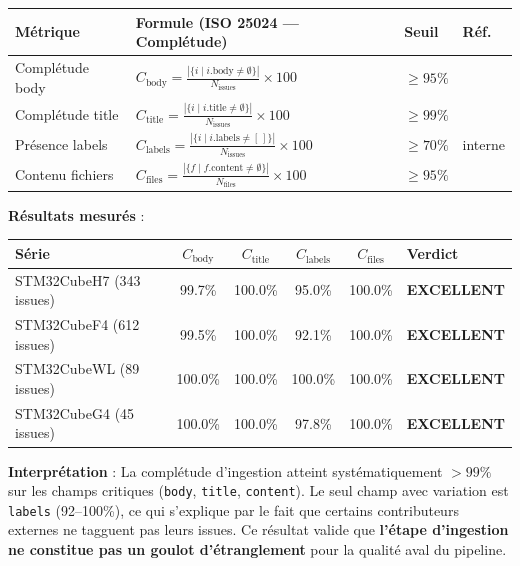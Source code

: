 \documentclass[12pt,a4paper]{report}
\begin{document}
\begin{longtable}{p{4.5cm}p{5.5cm}p{2.5cm}p{1.5cm}}
\toprule
\textbf{Métrique} & \textbf{Formule (ISO 25024 --- Complétude)} & \textbf{Seuil} & \textbf{Réf.} \\
\midrule
Complétude body & $C_{\text{body}} = \frac{|\{i \mid i.\text{body} \neq \emptyset\}|}{N_{\text{issues}}} \times 100$ & $\geq 95\%$ & \cite{iso25024} \\
Complétude title & $C_{\text{title}} = \frac{|\{i \mid i.\text{title} \neq \emptyset\}|}{N_{\text{issues}}} \times 100$ & $\geq 99\%$ & \cite{iso25024} \\
Présence labels & $C_{\text{labels}} = \frac{|\{i \mid i.\text{labels} \neq [\,]\}|}{N_{\text{issues}}} \times 100$ & $\geq 70\%$ & interne \\
Contenu fichiers & $C_{\text{files}} = \frac{|\{f \mid f.\text{content} \neq \emptyset\}|}{N_{\text{files}}} \times 100$ & $\geq 95\%$ & \cite{iso25024} \\
\bottomrule
\end{longtable}

\textbf{Résultats mesurés} :

\begin{longtable}{lccccl}
\toprule
\textbf{Série} & $C_{\text{body}}$ & $C_{\text{title}}$ & $C_{\text{labels}}$ & $C_{\text{files}}$ & \textbf{Verdict} \\
\midrule
STM32CubeH7 (343 issues) & 99.7\% & 100.0\% & 95.0\% & 100.0\% & \textcolor{green!60!black}{\textbf{EXCELLENT}} \\
STM32CubeF4 (612 issues) & 99.5\% & 100.0\% & 92.1\% & 100.0\% & \textcolor{green!60!black}{\textbf{EXCELLENT}} \\
STM32CubeWL (89 issues) & 100.0\% & 100.0\% & 100.0\% & 100.0\% & \textcolor{green!60!black}{\textbf{EXCELLENT}} \\
STM32CubeG4 (45 issues) & 100.0\% & 100.0\% & 97.8\% & 100.0\% & \textcolor{green!60!black}{\textbf{EXCELLENT}} \\
\bottomrule
\end{longtable}

\textbf{Interprétation} : La complétude d'ingestion atteint systématiquement $>99\%$ sur les champs critiques (\texttt{body}, \texttt{title}, \texttt{content}). Le seul champ avec variation est \texttt{labels} (92--100\%), ce qui s'explique par le fait que certains contributeurs externes ne tagguent pas leurs issues. Ce résultat valide que \textbf{l'étape d'ingestion ne constitue pas un goulot d'étranglement} pour la qualité aval du pipeline.
\end{document}
